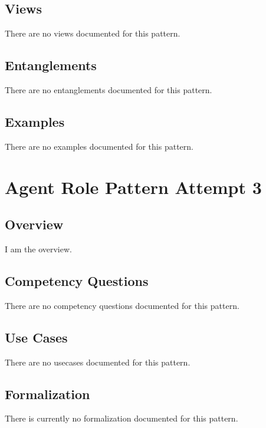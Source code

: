 \subsection{Views}
\label{ssec:views}
There are no views documented for this pattern.


\subsection{Entanglements}
\label{ssec:entanglements}
There are no entanglements documented for this pattern.

\subsection{Examples}
\label{ssec:examples}
There are no examples documented for this pattern.


\section{Agent Role Pattern Attempt 3}
\label{sec:agent-role-pattern-attempt-3}
\subsection{Overview}
\label{ssec:overview}
I am the overview.

\subsection{Competency Questions}
\label{ssec:cqs}
There are no competency questions documented for this pattern.

\subsection{Use Cases}
\label{ssec:use-cases}
There are no usecases documented for this pattern.
\subsection{Formalization}
\label{ssec:formalization}
There is currently no formalization documented for this pattern.

